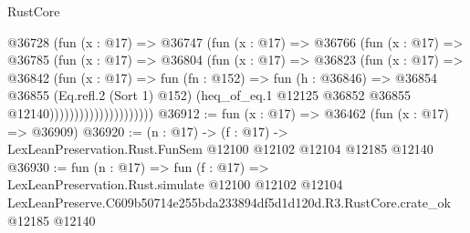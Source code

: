 \begin{lexlean}{RustCore}
\begin{coremodule}
                            @36728
                              (fun (x : @17) =>
                              @36747
                                (fun (x : @17) =>
                                @36766
                                  (fun (x : @17) =>
                                  @36785
                                    (fun (x : @17) =>
                                    @36804
                                      (fun (x : @17) =>
                                      @36823
                                        (fun (x : @17) =>
                                        @36842
                                          (fun (x : @17) =>
                                          fun (fn : @152) =>
                                          fun (h : @36846) =>
                                          @36854
                                            @36855
                                            (Eq.refl.{2} (Sort 1) @152)
                                            (heq_of_eq.{1}
                                              @12125
                                              @36852
                                              @36855
                                              @12140)))))))))))))))))))))
@36912 := fun (x : @17) => @36462 (fun (x : @17) => @36909)
@36920 := (n : @17) ->
  (f : @17) -> LexLeanPreservation.Rust.FunSem @12100 @12102 @12104 @12185 @12140
@36930 := fun (n : @17) =>
  fun (f : @17) =>
  LexLeanPreservation.Rust.simulate
    @12100
    @12102
    @12104
    LexLeanPreserve.C609b50714e255bda233894df5d1d120d.R3.RustCore.crate_ok
    @12185
    @12140
\end{coremodule}
\end{lexlean}
